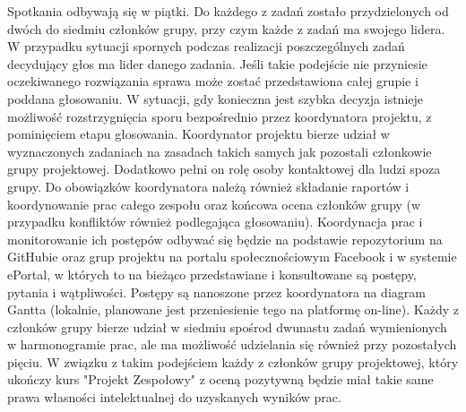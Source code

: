 Spotkania odbywają się w piątki. Do każdego z zadań zostało przydzielonych od dwóch do siedmiu członków grupy, przy czym każde z zadań ma swojego lidera. W przypadku sytuacji spornych podczas realizacji poszczególnych zadań decydujący głos ma lider danego zadania. Jeśli takie podejście nie przyniesie oczekiwanego rozwiązania sprawa może zostać przedstawiona całej grupie i poddana głosowaniu. W sytuacji, gdy konieczna jest szybka decyzja istnieje możliwość rozstrzygnięcia sporu bezpośrednio przez koordynatora projektu, z pominięciem etapu głosowania. Koordynator projektu bierze udział w wyznaczonych zadaniach na zasadach takich samych jak pozostali członkowie grupy projektowej. Dodatkowo pełni on rolę osoby kontaktowej dla ludzi spoza grupy. Do obowiązków koordynatora należą również składanie raportów i koordynowanie prac całego zespołu oraz końcowa ocena członków grupy (w przypadku konfliktów również podlegająca głosowaniu). Koordynacja prac i monitorowanie ich postępów odbywać się będzie na podstawie repozytorium na GitHubie oraz grup projektu na portalu społecznościowym Facebook i w systemie ePortal, w których to na bieżąco przedstawiane i konsultowane są postępy, pytania i wątpliwości. Postępy są nanoszone przez koordynatora na diagram Gantta (lokalnie, planowane jest przeniesienie tego na platformę on-line). Każdy z członków grupy bierze udział w siedmiu spośrod dwunastu zadań wymienionych w harmonogramie prac, ale ma możliwość udzielania się również przy pozostałych pięciu. W związku z takim podejściem każdy z członków grupy projektowej, który ukończy kurs "Projekt Zespołowy" z oceną pozytywną będzie miał takie same prawa własności intelektualnej do uzyskanych wyników prac.
